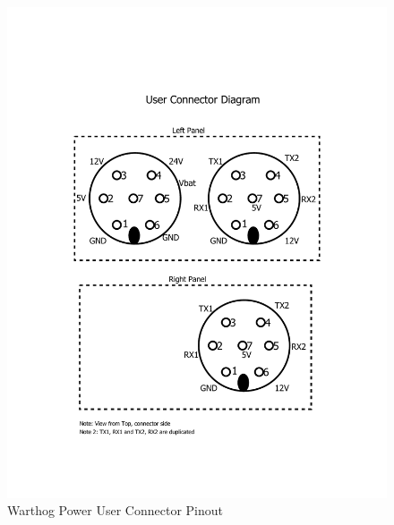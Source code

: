 \documentclass[]{clearpath-latex/clearpath-manual}
\begin{document}
\begin{figure}[!htb]
  \centering
  \includegraphics[width=1.0\linewidth]{user-connector-diagram.pdf}
  \caption{Warthog Power User Connector Pinout}
  \label{userpowerpinout}
\end{figure}

\pagebreak
\end{document}
